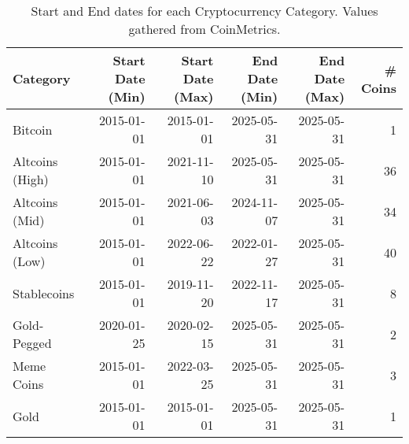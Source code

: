 \begin{table}[ht]
\centering
\scriptsize
\setlength{\tabcolsep}{4pt}
\begin{tabular}{lrrrrr}
\toprule
Category & Start Date (Min) & Start Date (Max) & End Date (Min) & End Date (Max) & \# Coins \\
\midrule
Bitcoin & 2015-01-01 & 2015-01-01 & 2025-05-31 & 2025-05-31 & 1 \\
Altcoins (High) & 2015-01-01 & 2021-11-10 & 2025-05-31 & 2025-05-31 & 36 \\
Altcoins (Mid) & 2015-01-01 & 2021-06-03 & 2024-11-07 & 2025-05-31 & 34 \\
Altcoins (Low) & 2015-01-01 & 2022-06-22 & 2022-01-27 & 2025-05-31 & 40 \\
Stablecoins & 2015-01-01 & 2019-11-20 & 2022-11-17 & 2025-05-31 & 8 \\
Gold-Pegged & 2020-01-25 & 2020-02-15 & 2025-05-31 & 2025-05-31 & 2 \\
Meme Coins & 2015-01-01 & 2022-03-25 & 2025-05-31 & 2025-05-31 & 3 \\
Gold & 2015-01-01 & 2015-01-01 & 2025-05-31 & 2025-05-31 & 1 \\
\bottomrule
\end{tabular}
\caption{Start and End dates for each Cryptocurrency Category. Values gathered from CoinMetrics.}
\label{tab:crypto_return_summary}
\end{table}
